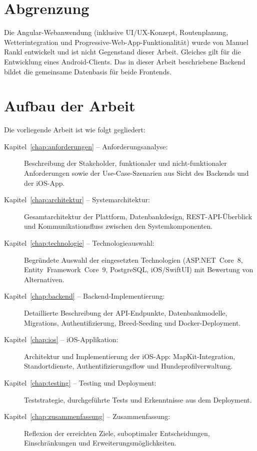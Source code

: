 \section{Abgrenzung}
\label{sec:abgrenzung}

Die Angular-Webanwendung (inklusive UI/UX-Konzept, Routenplanung, Wetterintegration und
Progressive-Web-App-Funktionalität) wurde von Manuel Rankl entwickelt und ist nicht
Gegenstand dieser Arbeit. Gleiches gilt für die Entwicklung eines Android-Clients. Das in
dieser Arbeit beschriebene Backend bildet die gemeinsame Datenbasis für beide Frontends.

\section{Aufbau der Arbeit}
\label{sec:aufbau}

Die vorliegende Arbeit ist wie folgt gegliedert:

\begin{description}
  \item[Kapitel~\ref{chap:anforderungen} – Anforderungsanalyse:]
    Beschreibung der Stakeholder, funktionaler und nicht-funktionaler Anforderungen sowie
    der Use-Case-Szenarien aus Sicht des Backends und der iOS-App.
  \item[Kapitel~\ref{chap:architektur} – Systemarchitektur:]
    Gesamtarchitektur der Plattform, Datenbankdesign, REST-API-Überblick und
    Kommunikationsfluss zwischen den Systemkomponenten.
  \item[Kapitel~\ref{chap:technologie} – Technologieauswahl:]
    Begründete Auswahl der eingesetzten Technologien (ASP.NET~Core~8, Entity~Framework~Core~9,
    PostgreSQL, iOS/SwiftUI) mit Bewertung von Alternativen.
  \item[Kapitel~\ref{chap:backend} – Backend-Implementierung:]
    Detaillierte Beschreibung der API-Endpunkte, Datenbankmodelle, Migrations,
    Authentifizierung, Breed-Seeding und Docker-Deployment.
  \item[Kapitel~\ref{chap:ios} – iOS-Applikation:]
    Architektur und Implementierung der iOS-App: MapKit-Integration, Standortdienste,
    Authentifizierungsflow und Hundeprofilverwaltung.
  \item[Kapitel~\ref{chap:testing} – Testing und Deployment:]
    Teststrategie, durchgeführte Tests und Erkenntnisse aus dem Deployment.
  \item[Kapitel~\ref{chap:zusammenfassung} – Zusammenfassung:]
    Reflexion der erreichten Ziele, suboptimaler Entscheidungen, Einschränkungen und
    Erweiterungsmöglichkeiten.
\end{description}
